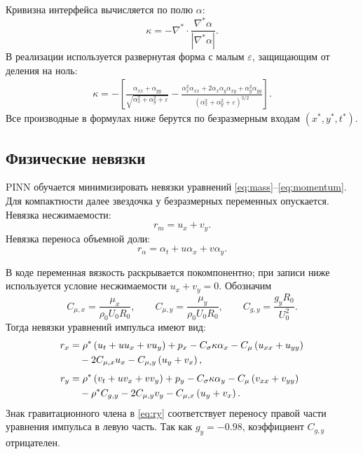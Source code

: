 \documentclass[12pt,a4paper]{article}
\newcommand{\Rbase}{R_0}
\newcommand{\Uref}{U_0}
\newcommand{\rhoref}{\rho_0}
\begin{document}
Кривизна интерфейса вычисляется по полю \(\alpha\):
\begin{equation}
    \kappa
    =
    -\nabla^*\cdot
    \frac{\nabla^*\alpha}{|\nabla^*\alpha|}.
    \label{eq:curvature_vector}
\end{equation}
В реализации используется развернутая форма с малым \(\varepsilon\), защищающим
от деления на ноль:
\begin{align}
    \kappa
    =
    -\left[
    \frac{\alpha_{xx}+\alpha_{yy}}{\sqrt{\alpha_x^2+\alpha_y^2+\varepsilon}}
    -
    \frac{
        \alpha_x^2\alpha_{xx}
        +2\alpha_x\alpha_y\alpha_{xy}
        +\alpha_y^2\alpha_{yy}
    }{
        \left(\alpha_x^2+\alpha_y^2+\varepsilon\right)^{3/2}
    }
    \right].
    \label{eq:curvature_expanded}
\end{align}
Все производные в формулах ниже берутся по безразмерным входам
\((x^*,y^*,t^*)\).

\subsection{Физические невязки}

PINN обучается минимизировать
невязки уравнений \eqref{eq:mass}--\eqref{eq:momentum}. Для компактности далее
звездочка у безразмерных переменных опускается. Невязка несжимаемости:
\begin{equation}
    r_m=u_x+v_y.
\end{equation}
Невязка переноса объемной доли:
\begin{equation}
    r_\alpha=\alpha_t+u\alpha_x+v\alpha_y.
\end{equation}

В коде переменная вязкость раскрывается покомпонентно; при записи ниже
используется условие несжимаемости \(u_x+v_y=0\). Обозначим
\[
    C_{\mu,x}=\frac{\mu_x}{\rhoref\Uref\Rbase},
    \qquad
    C_{\mu,y}=\frac{\mu_y}{\rhoref\Uref\Rbase},
    \qquad
    C_{g,y}=\frac{g_y\Rbase}{\Uref^2}.
\]
Тогда невязки уравнений импульса имеют вид:
\begin{align}
    r_x
    &=
    \rho^*
    \left(u_t+uu_x+vu_y\right)
    +p_x
    -C_\sigma\kappa\alpha_x
    -C_\mu\left(u_{xx}+u_{yy}\right)
    \notag\\
    &\quad
    -2C_{\mu,x}u_x
    -C_{\mu,y}\left(u_y+v_x\right),
    \label{eq:rx}
    \\[0.4em]
    r_y
    &=
    \rho^*
    \left(v_t+uv_x+vv_y\right)
    +p_y
    -C_\sigma\kappa\alpha_y
    -C_\mu\left(v_{xx}+v_{yy}\right)
    \notag\\
    &\quad
    -\rho^*C_{g,y}
    -2C_{\mu,y}v_y
    -C_{\mu,x}\left(u_y+v_x\right).
    \label{eq:ry}
\end{align}
Знак гравитационного члена в \eqref{eq:ry} соответствует переносу правой части
уравнения импульса в левую часть. Так как \(g_y=-0.98\), коэффициент
\(C_{g,y}\) отрицателен.
\end{document}
